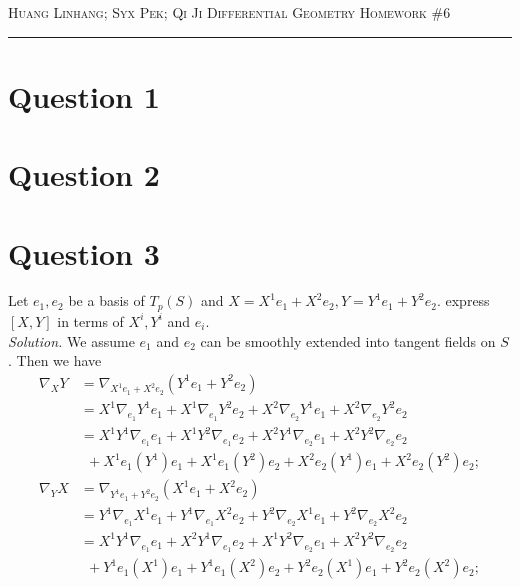 \documentclass[12pt]{article}
\begin{document}
\thispagestyle{empty}

{\scshape Huang Linhang; Syx Pek; Qi Ji} \hfill {\scshape \large Differential Geometry} \hfill {\scshape Homework \#6}
 
\smallskip
\hrule
\bigskip

\section*{Question 1}

\section*{Question 2}

\section*{Question 3}
Let $e_1,e_2$ be a basis of $T_p(S)$ and $X=X^1e_1+X^2e_2, Y=Y^1e_1+Y^2e_2$. express $[X,Y]$ in terms of $X^i, Y^i$ and $e_i$.
\\
\textit{Solution.} We assume $e_1$ and $e_2$ can be smoothly extended into tangent fields on $S$. Then we have
\begin{align*}
    \nabla_XY &= \nabla_{X^1e_1+X^2e_2}(Y^1e_1+Y^2e_2)\\
    &=X^1\nabla_{e_1}Y^1e_1 + X^1\nabla_{e_1}Y^2e_2 +
    X^2\nabla_{e_2}Y^1e_1 + X^2\nabla_{e_2}Y^2e_2\\
    &=X^1Y^1\nabla_{e_1}e_1 + X^1Y^2\nabla_{e_1}e_2 +
    X^2Y^1\nabla_{e_2}e_1 + X^2Y^2\nabla_{e_2}e_2\\
    &~~+X^1e_1(Y^1)e_1 + X^1e_1(Y^2)e_2+ X^2e_2(Y^1)e_1+X^2e_2(Y^2)e_2;\\
    \nabla_YX &= \nabla_{Y^1e_1+Y^2e_2}(X^1e_1+X^2e_2)\\
    &=Y^1\nabla_{e_1}X^1e_1 + Y^1\nabla_{e_1}X^2e_2 +
    Y^2\nabla_{e_2}X^1e_1 + Y^2\nabla_{e_2}X^2e_2\\
    &=X^1Y^1\nabla_{e_1}e_1 + X^2Y^1\nabla_{e_1}e_2 +
    X^1Y^2\nabla_{e_2}e_1 + X^2Y^2\nabla_{e_2}e_2\\
    &~~+Y^1e_1(X^1)e_1 + Y^1e_1(X^2)e_2+ Y^2e_2(X^1)e_1+Y^2e_2(X^2)e_2;\\
\end{align*}
\end{document}
